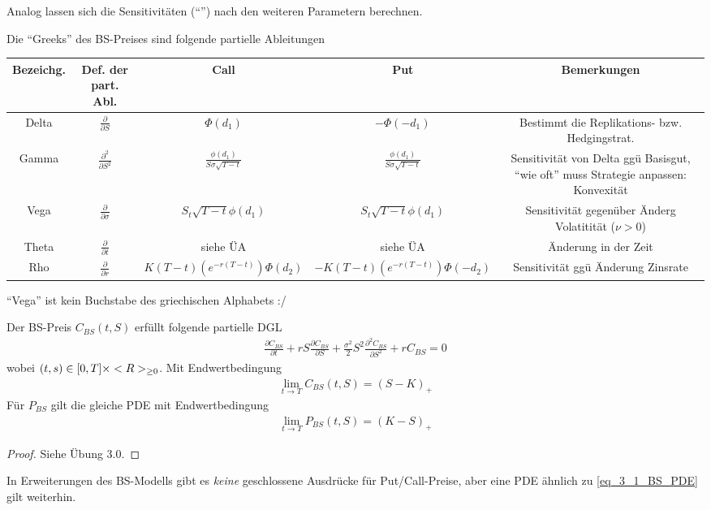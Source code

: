 Analog lassen sich die Sensitivitäten (``'') nach den weiteren Parametern berechnen.
\begin{definition}
	Die ``Greeks'' des BS-Preises sind folgende partielle Ableitungen\\
	\begin{tabular}{|c|c|c|c|c|} %
		Bezeichg. & Def. der part. Abl. & Call & Put & Bemerkungen\\
		\hline
		Delta & $\frac{\partial}{\partial S}$ & $\Phi(d_1)$ & $-\Phi(-d_1)$ & Bestimmt die Replikations- bzw. Hedgingstrat.\\
		Gamma & $\frac{\partial^2}{\partial S^2}$ & $\frac{\phi(d_1)}{S\sigma\sqrt{T-t}}$ & $\frac{\phi(d_1)}{S\sigma\sqrt{T-t}}$ & Sensitivität von Delta ggü Basisgut, ``wie oft'' muss Strategie anpassen: Konvexität\\
		Vega & $\frac{\partial}{\partial \sigma}$ & $S_t \sqrt{T-t}\phi(d_1)$ & $S_t \sqrt{T-t}\phi(d_1)$ & Sensitivität gegenüber Änderg Volatitität ($\nu >0$)\\
		Theta & $\frac{\partial}{\partial t}$ & siehe ÜA & siehe ÜA & Änderung in der Zeit\\
		Rho & $\frac{\partial}{\partial r}$ & $K(T-t)(e^{-r(T-t)}) \Phi(d_2)$ & $-K(T-t)(e^{-r(T-t)}) \Phi(-d_2)$ & Sensitivität ggü Änderung Zinsrate
	\end{tabular}
\end{definition}
\begin{*remark}
	``Vega'' ist kein Buchstabe des griechischen Alphabets :/
\end{*remark}
\begin{conclusion}
	Der BS-Preis $C_{BS}(t,S)$ erfüllt folgende partielle DGL
	\begin{align*}
	\frac{\partial C_{BS}}{\partial t} + rS\frac{\partial C_{BS}}{\partial S} + \frac{\sigma^2}{2}S^2 \frac{\partial^2 C_{BS}}{\partial S^2}+rC_{BS} = 0 \tag{BS-PDE}\label{eq_3_1_BS_PDE}
	\end{align*}
	wobei $(t,s) \in [0,T]\times <R>_{\ge 0}$. Mit Endwertbedingung
	\begin{align*}
	\lim_{t \to T} C_{BS}(t,S) = (S-K)_+
	\end{align*}
	Für $P_{BS}$ gilt die gleiche PDE mit Endwertbedingung
	\begin{align*}
	\lim_{t \to T} P_{BS}(t,S) = (K-S)_+
	\end{align*}
\end{conclusion}
\begin{proof}
	Siehe Übung 3.0.
\end{proof}
\begin{*remark}
	In Erweiterungen des BS-Modells gibt es \emph{keine} geschlossene Ausdrücke für Put/Call-Preise, aber eine PDE ähnlich zu \eqref{eq_3_1_BS_PDE} gilt weiterhin.
\end{*remark}
